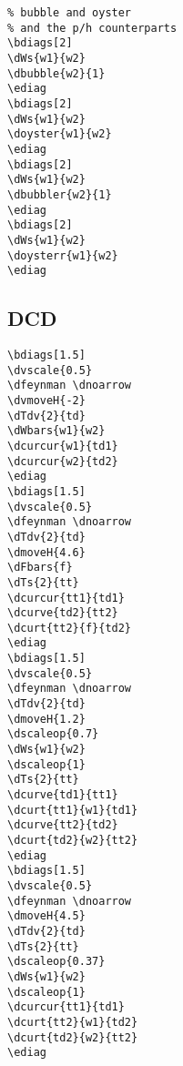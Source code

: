 \documentclass[a4paper]{article}
\begin{document}
\begin{minipage}[b]{0.55\linewidth}\centering
 \begin{lstlisting}
% bubble and oyster
% and the p/h counterparts 
\bdiags[2]
\dWs{w1}{w2}
\dbubble{w2}{1}
\ediag
\bdiags[2]
\dWs{w1}{w2}
\doyster{w1}{w2}
\ediag
\bdiags[2]
\dWs{w1}{w2}
\dbubbler{w2}{1}
\ediag
\bdiags[2]
\dWs{w1}{w2}
\doysterr{w1}{w2}
\ediag
\end{lstlisting}
\end{minipage}
 \begin{minipage}[b]{0.45\linewidth}\centering
\bdiags[2]
\ediag
\bdiags[2]
\ediag
\bdiags[2]
\ediag
\bdiags[2]
\ediag
\end{minipage}

\subsection{DCD}
\begin{minipage}[b]{0.55\linewidth}\centering
\begin{lstlisting}
\bdiags[1.5]
\dvscale{0.5}
\dfeynman \dnoarrow
\dvmoveH{-2}
\dTdv{2}{td}
\dWbars{w1}{w2}
\dcurcur{w1}{td1}
\dcurcur{w2}{td2}
\ediag
\bdiags[1.5]
\dvscale{0.5}
\dfeynman \dnoarrow
\dTdv{2}{td}
\dmoveH{4.6}
\dFbars{f}
\dTs{2}{tt}
\dcurcur{tt1}{td1}
\dcurve{td2}{tt2}
\dcurt{tt2}{f}{td2}
\ediag
\bdiags[1.5]
\dvscale{0.5}
\dfeynman \dnoarrow
\dTdv{2}{td}
\dmoveH{1.2}
\dscaleop{0.7}
\dWs{w1}{w2}
\dscaleop{1}
\dTs{2}{tt}
\dcurve{td1}{tt1}
\dcurt{tt1}{w1}{td1}
\dcurve{tt2}{td2}
\dcurt{td2}{w2}{tt2}
\ediag
\bdiags[1.5]
\dvscale{0.5}
\dfeynman \dnoarrow
\dmoveH{4.5}
\dTdv{2}{td}
\dTs{2}{tt}
\dscaleop{0.37}
\dWs{w1}{w2}
\dscaleop{1}
\dcurcur{tt1}{td1}
\dcurt{tt2}{w1}{td2}
\dcurt{td2}{w2}{tt2}
\ediag
\end{lstlisting}
\end{minipage}
\begin{minipage}[b]{0.45\linewidth}\centering
\bdiags[1.5]
\dfeynman \dnoarrow
{}
\ediag
\bdiags[1.5]
\dfeynman \dnoarrow
{}
\ediag
\bdiags[1.5]
\dfeynman \dnoarrow
{}
\ediag
\bdiags[1.5]
\dfeynman \dnoarrow
{}
\ediag
\end{minipage}
\end{document}
